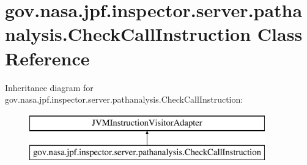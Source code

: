 \hypertarget{classgov_1_1nasa_1_1jpf_1_1inspector_1_1server_1_1pathanalysis_1_1_check_call_instruction}{}\section{gov.\+nasa.\+jpf.\+inspector.\+server.\+pathanalysis.\+Check\+Call\+Instruction Class Reference}
\label{classgov_1_1nasa_1_1jpf_1_1inspector_1_1server_1_1pathanalysis_1_1_check_call_instruction}
Inheritance diagram for gov.\+nasa.\+jpf.\+inspector.\+server.\+pathanalysis.\+Check\+Call\+Instruction\+:\begin{figure}[H]
\begin{center}
\leavevmode
\includegraphics[height=2.000000cm]{classgov_1_1nasa_1_1jpf_1_1inspector_1_1server_1_1pathanalysis_1_1_check_call_instruction}
\end{center}
\end{figure}
